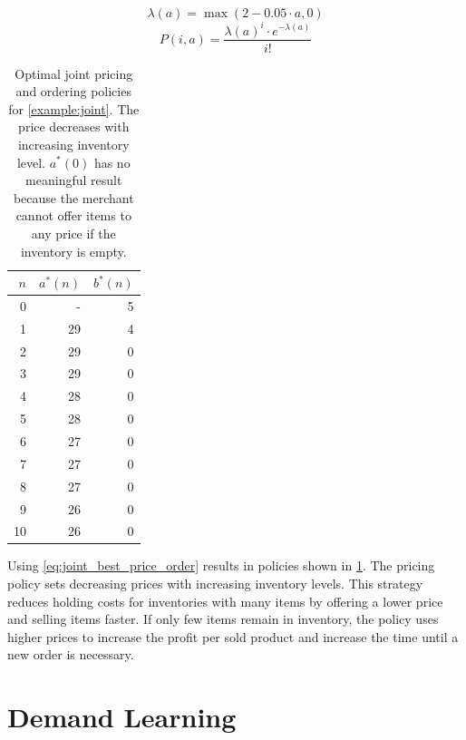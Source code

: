 \begin{equation}
\lambda(a) = \max(2 - 0.05 \cdot a, 0)
\end{equation}
\begin{equation}
P(i, a) = \frac{\lambda(a)^i \cdot e^{-\lambda(a)}}{i!}
\label{eq:example_joint_prob}
\end{equation}

\begin{table}[t]
	\centering
	\begin{tabular}{rrr}
		\toprule
		$n$ & $a^*(n)$ & $b^*(n)$ \\
		\midrule
		0 & - & 5 \\
		1 & 29 & 4 \\
		2 & 29 & 0 \\
		3 & 29 & 0\\
		4 & 28 & 0\\
		5 & 28 & 0\\
		6 & 27 & 0\\
		7 & 27 & 0\\
		8 & 27 & 0\\
		9 & 26 & 0\\
		10 & 26 & 0\\
		\bottomrule
	\end{tabular}
\caption[Numerical Example: Joint Pricing and Ordering Policy]{
Optimal joint pricing and ordering policies for \cref{example:joint}.
The price decreases with increasing inventory level.
$a^*(0)$ has no meaningful result because the merchant cannot offer items to any price if the inventory is empty.
}
\label{tab:example_joint}
\end{table}

Using \cref{eq:joint_best_price_order} results in policies shown in \cref{tab:example_joint}.
The pricing policy sets decreasing prices with increasing inventory levels.
This strategy reduces holding costs for inventories with many items by offering a lower price and selling items faster.
If only few items remain in inventory, the policy uses higher prices to increase the profit per sold product and increase the time until a new order is necessary.



\section{Demand Learning}
\label{section:demand_learning}

